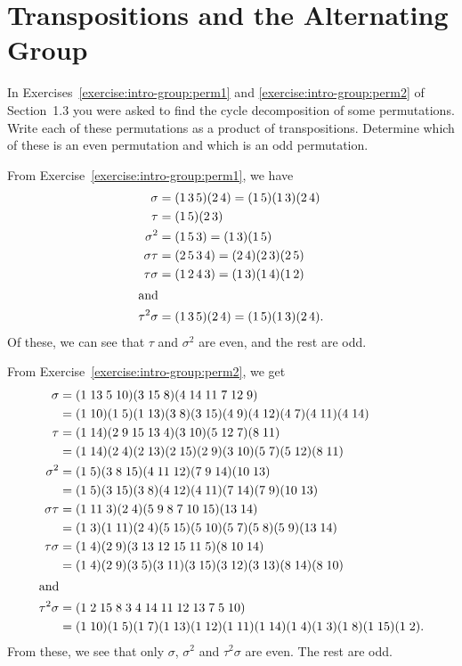 \section{Transpositions and the Alternating Group}

 In Exercises~\ref{exercise:intro-group:perm1} and
\ref{exercise:intro-group:perm2} of Section~1.3 you were asked to find
the cycle decomposition of some permutations. Write each of these
permutations as a product of transpositions. Determine which of these
is an even permutation and which is an odd permutation.
\begin{solution}
  From Exercise~\ref{exercise:intro-group:perm1}, we have
  \begin{align*}
    \sigma &= (1\,3\,5)(2\,4) = (1\,5)(1\,3)(2\,4) \\
    \tau &= (1\,5)(2\,3) \\
    \sigma^2 &= (1\,5\,3) = (1\,3)(1\,5) \\
    \sigma\tau &= (2\,5\,3\,4) = (2\,4)(2\,3)(2\,5) \\
    \tau\sigma &= (1\,2\,4\,3) = (1\,3)(1\,4)(1\,2) \\
    \intertext{and}
    \tau^2\sigma &= (1\,3\,5)(2\,4) = (1\,5)(1\,3)(2\,4).
  \end{align*}
  Of these, we can see that $\tau$ and $\sigma^2$ are even, and the
  rest are odd.

  From Exercise~\ref{exercise:intro-group:perm2}, we get
  \begin{align*}
    \sigma &= (1\;13\;5\;10)(3\;15\;8)(4\;14\;11\;7\;12\;9) \\
           &= (1\;10)(1\;5)(1\;13)(3\;8)(3\;15)
             (4\;9)(4\;12)(4\;7)(4\;11)(4\;14) \\
    \tau &= (1\;14)(2\;9\;15\;13\;4)(3\;10)(5\;12\;7)(8\;11) \\
           &= (1\;14)(2\;4)(2\;13)(2\;15)(2\;9)(3\;10)
             (5\;7)(5\;12)(8\;11) \\
    \sigma^2 &= (1\;5)(3\;8\;15)(4\;11\;12)(7\;9\;14)(10\;13) \\
           &= (1\;5)(3\;15)(3\;8)(4\;12)(4\;11)(7\;14)(7\;9)(10\;13) \\
    \sigma\tau &= (1\;11\;3)(2\;4)(5\;9\;8\;7\;10\;15)(13\;14) \\
           &= (1\;3)(1\;11)(2\;4)(5\;15)(5\;10)(5\;7)(5\;8)(5\;9)(13\;14) \\
    \tau\sigma &= (1\;4)(2\;9)(3\;13\;12\;15\;11\;5)(8\;10\;14) \\
           &= (1\;4)(2\;9)(3\;5)(3\;11)(3\;15)(3\;12)(3\;13)(8\;14)(8\;10) \\
    \intertext{and}
    \tau^2\sigma &= (1\;2\;15\;8\;3\;4\;14\;11\;12\;13\;7\;5\;10) \\
           &= (1\;10)(1\;5)(1\;7)(1\;13)(1\;12)(1\;11)(1\;14)
             (1\;4)(1\;3)(1\;8)(1\;15)(1\;2).
  \end{align*}
  From these, we see that only $\sigma$, $\sigma^2$ and $\tau^2\sigma$
  are even. The rest are odd.
\end{solution}

